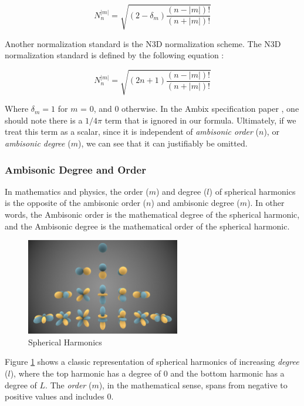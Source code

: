 \begin{equation}
N_{n}^{|m|}=\sqrt{\left(2-\delta_{m}\right) \frac{(n-|m|) !}{(n+|m|) !}}
\end{equation}

Another normalization standard is the N3D normalization scheme. The N3D normalization standard is defined by the following equation \cite{politis2016jsambisonics}:

\begin{equation}
N_{n}^{|m|}= \sqrt{(2 n+1) \frac{(n-|m|) !}{(n+|m|) !}}
\end{equation}

Where $\delta_m = 1$ for $m$ = 0, and 0 otherwise. In the Ambix specification paper \cite{nachbar2011ambix}, one should note there is a $1/4\pi$ term that is ignored in our formula. Ultimately, if we treat this term as a scalar, since it is independent of \textit{ambisonic order} ($n$), or \textit{ambisonic degree} ($m$), we can see that it can justifiably be omitted. 

\subsubsection{Ambisonic Degree and Order}

In mathematics and physics, the order ($m$) and degree ($l$) of spherical harmonics is the opposite of the ambisonic order ($n$) and ambisonic degree ($m$). In other words, the Ambisonic order is the mathematical degree of the spherical harmonic, and the Ambisonic degree is the mathematical order of the spherical harmonic. 

\begin{figure}[ht!]%
\centering
\includegraphics[width=0.6\textwidth]{img/sph-harm.png}
\caption{Spherical Harmonics \cite{Spherica39online}}
\label{fig:sph-harm}
\end{figure}

Figure \ref{fig:sph-harm} shows a classic representation of spherical harmonics of increasing \textit{degree} ($l$), where the top harmonic has a degree of 0 and the bottom harmonic has a degree of $L$. The \textit{order} ($m$), in the mathematical sense, spans from negative to positive values and includes 0. 

